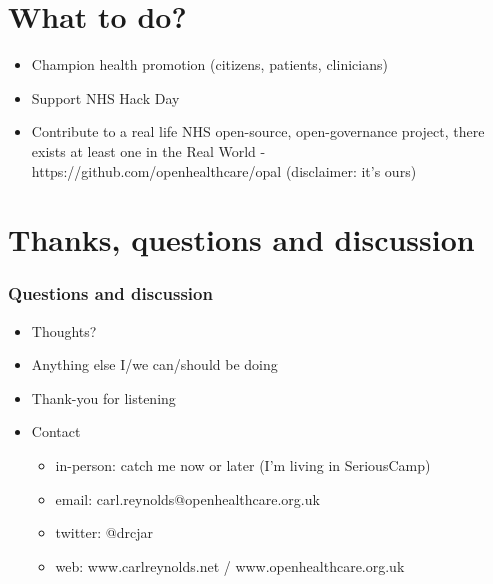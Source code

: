 \documentclass[handout, red]{beamer}
\begin{document}
\section{What to do?}
\begin{frame}
\begin{itemize}
  \item Champion health promotion (citizens, patients, clinicians)
  \item Support NHS Hack Day
  \item Contribute to a real life NHS open-source, open-governance project, there exists at least one in the Real World - https://github.com/openhealthcare/opal
  (disclaimer: it's ours)
 \end{itemize}
\end{frame}	
  

\section{Thanks, questions and discussion}
\begin{frame}
  \frametitle{Questions and discussion}   %

  \begin{itemize}
  \item Thoughts?
  \item Anything else I/we can/should be doing
  \item Thank-you for listening
  
  \item Contact \begin{itemize}
	 \item in-person: catch me now or later (I'm living in SeriousCamp)
         \item email: carl.reynolds@openhealthcare.org.uk
	 \item twitter: @drcjar 
	 \item web: www.carlreynolds.net / www.openhealthcare.org.uk
        \end{itemize}
 
  \end{itemize}
\end{frame}

\note{} 


\end{document}
